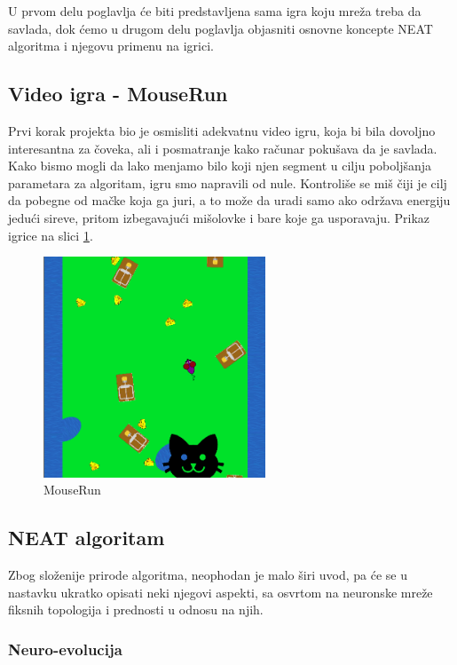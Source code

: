 \documentclass[a4paper]{article}
\begin{document}
U prvom delu poglavlja će biti predstavljena sama igra koju mreža treba da savlada, dok ćemo u drugom delu poglavlja objasniti osnovne koncepte NEAT algoritma i njegovu primenu na igrici.

\subsection{Video igra - MouseRun}
\label{mouserun}

Prvi korak projekta bio je osmisliti adekvatnu video igru, koja bi bila dovoljno interesantna za čoveka, ali i posmatranje kako računar pokušava da je savlada. Kako bismo mogli da lako menjamo bilo koji njen segment u cilju poboljšanja parametara za algoritam, igru smo napravili od nule.
Kontroliše se miš čiji je cilj da pobegne od mačke koja ga juri, a to može da uradi samo ako održava energiju jedući sireve, pritom izbegavajući mišolovke i bare koje ga usporavaju. Prikaz igrice na slici \ref{fig:mouserun_img}.

\begin{figure}[!h]
\begin{center}
\includegraphics[width=250px, keepaspectratio]{mouse_run_1.png}
\end{center}
\caption{MouseRun}
\label{fig:mouserun_img}
\end{figure}

\subsection{NEAT algoritam}
\label{neat}

Zbog složenije prirode algoritma, neophodan je malo širi uvod, pa će se u nastavku ukratko opisati neki njegovi aspekti, sa osvrtom na neuronske mreže fiksnih topologija i prednosti u odnosu na njih.

\subsubsection*{Neuro-evolucija}
\label{neuro_evolucija}
\end{document}
